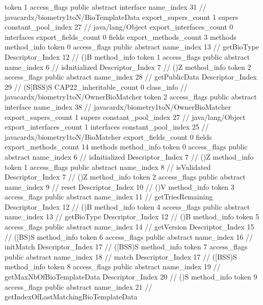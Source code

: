{{{			token	1
			access_flags	public abstract interface
			name_index	31		// javacardx/biometry1toN/BioTemplateData
			export_supers_count	1
			supers {
				constant_pool_index	27		// java/lang/Object
			}
			export_interfaces_count	0
			interfaces {
			}
			export_fields_count	0
			fields {
			}
			export_methods_count	3
			methods {
				method_info {
					token	0
					access_flags	public abstract
					name_index	13		// getBioType
					Descriptor_Index	12		// ()B
				}
				method_info {
					token	1
					access_flags	public abstract
					name_index	6		// isInitialized
					Descriptor_Index	7		// ()Z
				}
				method_info {
					token	2
					access_flags	public abstract
					name_index	28		// getPublicData
					Descriptor_Index	29		// (S[BSS)S
				}
			}
			CAP22_inheritable_count	0
		}
		class_info {		// javacardx/biometry1toN/OwnerBioMatcher
			token	2
			access_flags	public abstract interface
			name_index	38		// javacardx/biometry1toN/OwnerBioMatcher
			export_supers_count	1
			supers {
				constant_pool_index	27		// java/lang/Object
			}
			export_interfaces_count	1
			interfaces {
				constant_pool_index	25		// javacardx/biometry1toN/BioMatcher
			}
			export_fields_count	0
			fields {
			}
			export_methods_count	14
			methods {
				method_info {
					token	0
					access_flags	public abstract
					name_index	6		// isInitialized
					Descriptor_Index	7		// ()Z
				}
				method_info {
					token	1
					access_flags	public abstract
					name_index	8		// isValidated
					Descriptor_Index	7		// ()Z
				}
				method_info {
					token	2
					access_flags	public abstract
					name_index	9		// reset
					Descriptor_Index	10		// ()V
				}
				method_info {
					token	3
					access_flags	public abstract
					name_index	11		// getTriesRemaining
					Descriptor_Index	12		// ()B
				}
				method_info {
					token	4
					access_flags	public abstract
					name_index	13		// getBioType
					Descriptor_Index	12		// ()B
				}
				method_info {
					token	5
					access_flags	public abstract
					name_index	14		// getVersion
					Descriptor_Index	15		// ([BS)S
				}
				method_info {
					token	6
					access_flags	public abstract
					name_index	16		// initMatch
					Descriptor_Index	17		// ([BSS)S
				}
				method_info {
					token	7
					access_flags	public abstract
					name_index	18		// match
					Descriptor_Index	17		// ([BSS)S
				}
				method_info {
					token	8
					access_flags	public abstract
					name_index	19		// getMaxNbOfBioTemplateData
					Descriptor_Index	20		// ()S
				}
				method_info {
					token	9
					access_flags	public abstract
					name_index	21		// getIndexOfLastMatchingBioTemplateData
}}}}}
